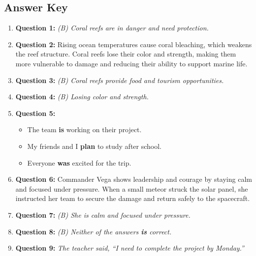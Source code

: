 \documentclass[12pt]{article}
\begin{document}
\subsection*{Answer Key}
\begin{enumerate}
    \item \textbf{Question 1:} \textit{(B) Coral reefs are in danger and need protection.}

    \item \textbf{Question 2:}  
    Rising ocean temperatures cause coral bleaching, which weakens the reef structure. Coral reefs lose their color and strength, making them more vulnerable to damage and reducing their ability to support marine life.

    \item \textbf{Question 3:} \textit{(B) Coral reefs provide food and tourism opportunities.}

    \item \textbf{Question 4:} \textit{(B) Losing color and strength.}

    \item \textbf{Question 5:}  
    \begin{itemize}
        \item The team \textbf{is} working on their project.  
        \item My friends and I \textbf{plan} to study after school.  
        \item Everyone \textbf{was} excited for the trip.  
    \end{itemize}

    \item \textbf{Question 6:}  
    Commander Vega shows leadership and courage by staying calm and focused under pressure. When a small meteor struck the solar panel, she instructed her team to secure the damage and return safely to the spacecraft.

    \item \textbf{Question 7:} \textit{(B) She is calm and focused under pressure.}

    \item \textbf{Question 8:} \textit{(B) Neither of the answers \textbf{is} correct.}

    \item \textbf{Question 9:}  
    \textit{The teacher said, “I need to complete the project by Monday.”}


\end{enumerate}
\end{document}
